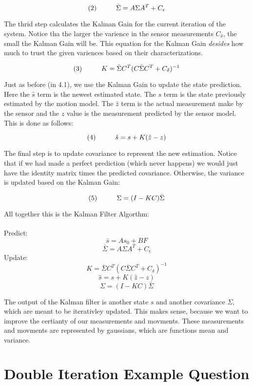 \documentclass[11pt]{article}
\begin{document}
\[
(2) \hspace{10mm} \bar{\Sigma} = A \Sigma A^T + C_{\epsilon}
\]

The thrid step calculates the Kalman Gain for the current iteration of the system.
Notice tha the larger the varience in the sensor measurements $C_{\delta}$, the
small the Kalman Gain will be. This equation for the Kalman Gain \textit{desides}
how much to trust the given variences based on their characterizations.

\[
(3) \hspace{10mm} K = \bar{\Sigma} C^T ( C \bar{\Sigma} C^T +  C_{\delta} )^{-1}
\]

Just as before (in 4.1), we use the Kalman Gain to update the state prediction.
Here the $\hat{s}$ term is the newest estimated state. The $s$ term is the state
previously estimated by the motion model. The $\hat{z}$ term is the actual measurement
make by the sensor and the $z$ value is the measurement predicted by the sensor
model. This is done as follows:

\[
(4) \hspace{10mm} \hat{s} = s + K ( \hat{z} - z )
\]

The final step is to update covariance to represent the new estimation. Notice that
if we had made a perfect prediction (which never happens) we would just have the
identity matrix times the predicted covariance. Otherwise, the variance is updated
based on the Kalman Gain:

\[
(5) \hspace{10mm} \Sigma = (I - K C) \bar{\Sigma}
\]

All together this is the Kalman Filter Algorthm:
\\
\\
Predict:
\[
\bar{s} = A s_0 + B F
\]
\[
\bar{\Sigma} = A \Sigma A^T + C_{\epsilon}
\]
Update:
\[
K = \bar{\Sigma} C^T ( C \bar{\Sigma} C^T +  C_{\delta} )^{-1}
\]
\[
\hat{s} = s + K ( \hat{z} - z )
\]
\[
\Sigma = (I - K C) \bar{\Sigma}
\]

The output of the Kalman filter is another state $s$ and another covariance $\Sigma$,
which are meant to be iterativley updated. This makes sense, because we want to
improve the certianty of our measurements and movments. These measurements and
movments are represented by gaussians, which are functions mean and variance.

\newpage
\section{Double Iteration Example Question}
\end{document}
